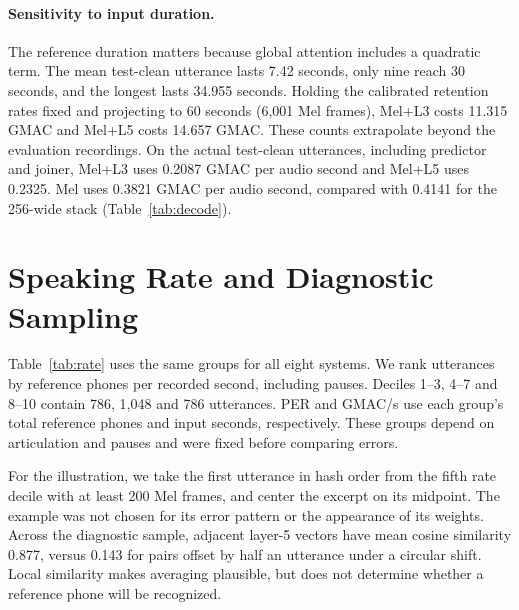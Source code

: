 \documentclass[11pt]{article}
\begin{document}
\paragraph{Sensitivity to input duration.}
The reference duration matters because global attention includes a quadratic term. The mean test-clean utterance lasts 7.42 seconds, only nine reach 30 seconds, and the longest lasts 34.955 seconds. Holding the calibrated retention rates fixed and projecting to 60 seconds (6,001 Mel frames), Mel+L3 costs 11.315 GMAC and Mel+L5 costs 14.657 GMAC. These counts extrapolate beyond the evaluation recordings. On the actual test-clean utterances, including predictor and joiner, Mel+L3 uses 0.2087 GMAC per audio second and Mel+L5 uses 0.2325. Mel uses 0.3821 GMAC per audio second, compared with 0.4141 for the 256-wide stack (Table~\ref{tab:decode}).

\section{Speaking Rate and Diagnostic Sampling}
\label{app:rate}
Table~\ref{tab:rate} uses the same groups for all eight systems. We rank utterances by reference phones per recorded second, including pauses. Deciles 1--3, 4--7 and 8--10 contain 786, 1,048 and 786 utterances. PER and GMAC/s use each group's total reference phones and input seconds, respectively. These groups depend on articulation and pauses and were fixed before comparing errors.

For the illustration, we take the first utterance in hash order from the fifth rate decile with at least 200 Mel frames, and center the excerpt on its midpoint. The example was not chosen for its error pattern or the appearance of its weights. Across the diagnostic sample, adjacent layer-5 vectors have mean cosine similarity 0.877, versus 0.143 for pairs offset by half an utterance under a circular shift. Local similarity makes averaging plausible, but does not determine whether a reference phone will be recognized.
\end{document}
